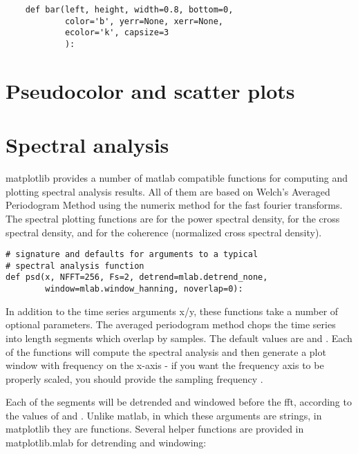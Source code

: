 \documentclass[twoside]{book}
\begin{document}
\begin{lstlisting}
    def bar(left, height, width=0.8, bottom=0,
            color='b', yerr=None, xerr=None, 
            ecolor='k', capsize=3
            ):
\end{lstlisting}



\section{Pseudocolor and scatter plots}
\label{sec:pcolor_scatter}

\section{Spectral analysis}
\label{sec:spectral}

matplotlib provides a number of matlab compatible functions for
computing and plotting spectral analysis results.  All of them are
based on Welch's Averaged Periodogram Method \citep{BendatPiersol1986}
using the numerix  method for the fast fourier transforms.
The spectral plotting functions are  for the power spectral
density,  for the cross spectral density, and 
for the coherence (normalized cross spectral density).

\begin{lstlisting}  
# signature and defaults for arguments to a typical
# spectral analysis function
def psd(x, NFFT=256, Fs=2, detrend=mlab.detrend_none, 
        window=mlab.window_hanning, noverlap=0):
\end{lstlisting}

In addition to the time series arguments x/y, these functions take a
number of optional parameters.  The averaged periodogram method chops
the time series into  length segments which overlap by
 samples.  The default values are  and
.  Each of the functions will compute the spectral
analysis and then generate a plot window with frequency on the x-axis
- if you want the frequency axis to be properly scaled, you should
provide the sampling frequency .

Each of the segments will be detrended and windowed before the fft,
according to the values of  and .  Unlike
matlab, in which these arguments are strings, in matplotlib they are
functions.  Several helper functions are provided in matplotlib.mlab
for detrending and windowing: 
\end{document}
